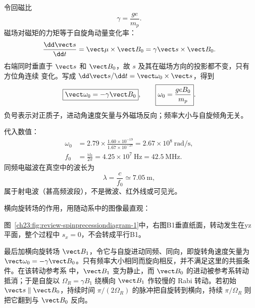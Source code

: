 \begin{xesolution}
令回磁比
\[
  \gamma=\frac{ge}{m_p}.
\]
磁场对磁矩的力矩等于自旋角动量变化率：
\begin{equation}
  \frac{\dd\vect s}{\dd t}=\vect\mu\times\vect B_0
  =\gamma\vect s\times\vect B_0.
\end{equation}
右端同时垂直于 $\vect s$ 和 $\vect B_0$，故 $s$ 及其在磁场方向的投影都不变，只有方位角连续
变化。写成 $\dd\vect s/\dd t=\vect\omega_0\times\vect s$，得到
\begin{equation}
  \boxed{\vect\omega_0=-\gamma\vect B_0},
  \qquad
  \boxed{\omega_0=\frac{geB_0}{m_p}}.
\end{equation}
负号表示对正质子，进动角速度矢量与外磁场反向；频率大小与自旋倾角无关。

代入数值：
\begin{align}
  \omega_0&=2.79\times\frac{1.60\times10^{-19}}{1.67\times10^{-27}}
  =2.67\times10^8\ \mathrm{rad/s},\\
  f_0&=\frac{\omega_0}{2\pi}=\boxed{4.25\times10^7\ \mathrm{Hz}}
  =\boxed{42.5\ \mathrm{MHz}}.
\end{align}
同频电磁波在真空中的波长为
\begin{equation}
  \boxed{\lambda=\frac{c}{f_0}\simeq7.05\ \mathrm m},
\end{equation}
属于射电波（甚高频波段），不是微波、红外线或可见光。

横向旋转场的作用，用随动系中的图像最直观：

图~\ref{ch23:fig:review-spinprecessiondiagram-1}中，右图B1垂直纸面，转动发生在yz平面，整个过程中 $s_x=0$，不会转成平行B1。
\par\noindent\begin{minipage}{\linewidth}
\spinPrecessionDiagram
{}\label{ch23:fig:review-spinprecessiondiagram-1}
\end{minipage}\par\medskip

最后加横向旋转场 $\vect B_1$，令它与自旋进动同频、同向，即旋转角速度矢量为
$\vect\omega_0=-\gamma\vect B_0$。只有频率大小相同而旋向相反，并不满足这里的共振条件。在该转动参考系
中，$\vect B_1$ 变为静止，而 $\vect B_0$ 的进动被参考系转动抵消；于是自旋以
$\boxed{\Omega_R=\gamma B_1}$ 绕横向 $\vect B_1$ 作较慢的 Rabi 转动。若初始
$\vect s\parallel\vect B_0$，持续时间
$\pi/(2\Omega_R)$ 的脉冲把自旋转到横向，持续 $\pi/\Omega_R$ 则把它翻到与 $\vect B_0$ 反向。

\end{xesolution}
